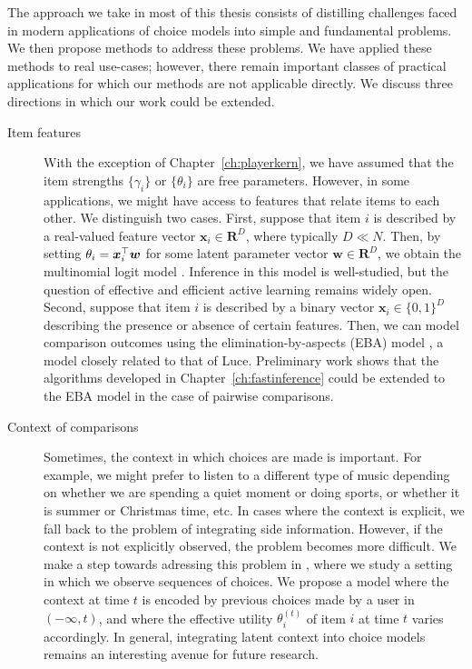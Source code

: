 The approach we take in most of this thesis consists of distilling challenges faced in modern applications of choice models into simple and fundamental problems.
We then propose methods to address these problems.
We have applied these methods to real use-cases; however, there remain important classes of practical applications for which our methods are not applicable directly.
We discuss three directions in which our work could be extended.

\begin{description}
\item[Item features] With the exception of Chapter~\ref{ch:playerkern}, we have assumed that the item strengths $\{ \gamma_i \}$ or $\{ \theta_i \}$ are free parameters.
However, in some applications, we might have access to features that relate items to each other.
We distinguish two cases.
First, suppose that item $i$ is described by a real-valued feature vector $\bm{x}_i \in \mathbf{R}^D$, where typically $D \ll N$.
Then, by setting $\theta_i = \bm{x}_i^\top \bm{w}$ for some latent parameter vector $\bm{w} \in \mathbf{R}^D$, we obtain the multinomial logit model \citep{mcfadden1973conditional, train2009discrete}.
Inference in this model is well-studied, but the question of effective and efficient active learning remains widely open.
Second, suppose that item $i$ is described by a binary vector $\bm{x}_i \in \{0, 1\}^D$ describing the presence or absence of certain features.
Then, we can model comparison outcomes using the elimination-by-aspects (EBA) model \citep{tversky1972elimination}, a model closely related to that of Luce.
Preliminary work shows that the algorithms developed in Chapter~\ref{ch:fastinference} could be extended to the EBA model in the case of pairwise comparisons.

\item[Context of comparisons] Sometimes, the context in which choices are made is important.
For example, we might prefer to listen to a different type of music depending on whether we are spending a quiet moment or doing sports, or whether it is summer or Christmas time, etc.
In cases where the context is explicit, we fall back to the problem of integrating side information.
However, if the context is not explicitly observed, the problem becomes more difficult.
We make a step towards adressing this problem in \citet{ko2016collaborative}, where we study a setting in which we observe sequences of choices.
We propose a model where the context at time $t$ is encoded by previous choices made by a user in $(-\infty, t)$, and where the effective utility $\theta_i^{(t)}$ of item $i$ at time $t$ varies accordingly.
In general, integrating latent context into choice models remains an interesting avenue for future research.


\end{description}
